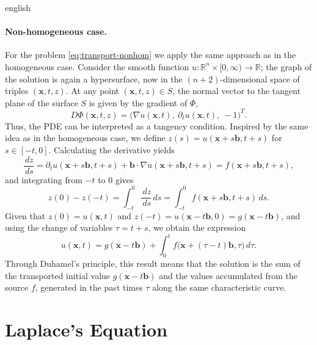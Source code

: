 \documentclass[../0000.tex]{subfiles}
\begin{document}
\begin{hyphenrules}{english}
\paragraph{Non-homogeneous case.}
For the problem \eqref{eq:transport-nonhom} we apply the same approach as in the homogeneous case.
Consider the smooth function
$u:\mathbb{R}^n\times[0,\infty)\to\mathbb{R}$; the graph of the solution is again a hypersurface, now in the
$(n+2)$-dimensional space of triples $(\mathbf{x},t,z)$. At any point $(\mathbf{x},t,z)\in S$, the normal vector to
the tangent plane of the surface $S$ is given by the gradient of $\Phi$,
\begin{equation}
  D\Phi(\mathbf{x},t,z)=\big(\nabla u(\mathbf{x},t),\ \partial_t u(\mathbf{x},t),\ -1\big)^{T}.
  \label{eq:transport-normal}
\end{equation}
Thus, the PDE can be interpreted as a tangency condition. Inspired by the same idea as in the
homogeneous case, we define $z(s)=u(\mathbf{x}+s\mathbf{b},t+s)$ for $s\in[-t,0]$. Calculating the derivative yields
\begin{equation}
  \frac{\,d z}{\,d s}=\partial_t u(\mathbf{x}+s\mathbf{b},t+s)+\mathbf{b}\cdot\nabla u(\mathbf{x}+s\mathbf{b},t+s)=f(\mathbf{x}+s\mathbf{b},t+s),
  \label{eq:transport-dz}
\end{equation}
and integrating from $-t$ to $0$ gives
\begin{equation}
  z(0)-z(-t)=\int_{-t}^{0}\frac{\,d z}{\,d s}\,d s=\int_{-t}^{0}f(\mathbf{x}+s\mathbf{b},t+s)\,d s.
  \label{eq:transport-int}
\end{equation}
Given that $z(0)=u(\mathbf{x},t)$ and $z(-t)=u(\mathbf{x}-t\mathbf{b},0)=g(\mathbf{x}-t\mathbf{b})$, and using the change of variables
$\tau=t+s$, we obtain the expression
\begin{equation}
  u(\mathbf{x},t)=g(\mathbf{x}-t\mathbf{b})+\int_{0}^{t}f\big(\mathbf{x}+(\tau-t)\mathbf{b},\tau\big)\,d\tau.
  \label{eq:app-transport-duhamel}
\end{equation}
Through Duhamel's principle, this result means that the solution is the sum of the transported initial
value $g(\mathbf{x}-t\mathbf{b})$ and the values accumulated from the source $f$, generated in the past times $\tau$
along the same characteristic curve.

\section{Laplace's Equation}\label{app-sec:laplace}


\end{hyphenrules}
\end{document}
